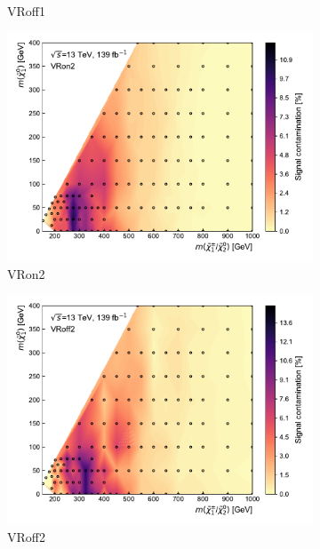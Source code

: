 \begin{figure}
\begin{subfigure}[b]{0.5\linewidth}
		\caption{VRoff1\label{fig:signal_contamination_VRoff1}}
	\end{subfigure}\hfill
	\begin{subfigure}[b]{0.5\linewidth}
		\centering\includegraphics[width=1.0\textwidth]{signal_contamination/plot_VRon2}
		\caption{VRon2\label{fig:signal_contamination_VRon2}}
	\end{subfigure}\hfill
	\begin{subfigure}[b]{0.5\linewidth}
		\centering\includegraphics[width=1.0\textwidth]{signal_contamination/plot_VRoff2}
		\caption{VRoff2\label{fig:signal_contamination_VRoff2}}
	\end{subfigure}\hfill
	\begin{subfigure}[b]{0.5\linewidth}

\end{subfigure}
\end{figure}

